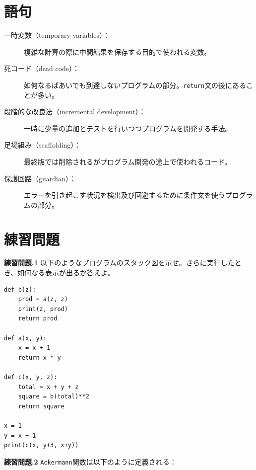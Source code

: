 \documentclass[a4j,12pt,makeidx]{jbook}
\newcommand{\tp}{\thechapter}
\begin{document}
\section{語句}
\begin{description}
\item[一時変数（temporary variables）：]複雑な計算の際に中間結果を保存する目的で使われる変数。

\item[死コード（dead code）：]如何なるばあいでも到達しないプログラムの部分。{\tt return}文の後にあることが多い。  

\item[段階的な改良法（incremental development）：]一時に少量の追加とテストを行いつつプログラムを開発する手法。

\item[足場組み（scaffolding）：]最終版では削除されるがプログラム開発の途上で使われるコード。

\item[保護回路（guardian）：]エラーを引き起こす状況を検出及び回避するために条件文を使うプログラムの部分。
\end{description}
%
\section{練習問題}
\noindent
{\bf 練習問題\tp.1} 以下のようなプログラムのスタック図を示せ。さらに実行したとき、如何なる表示が出るか答えよ。
\begin{verbatim}
def b(z):
    prod = a(z, z)
    print(z, prod)
    return prod

def a(x, y):
    x = x + 1
    return x * y

def c(x, y, z):
    total = x + y + z
    square = b(total)**2
    return square

x = 1
y = x + 1
print(c(x, y+3, x+y))
\end{verbatim}

\noindent
{\bf 練習問題\tp.2} {\tt Ackermann}関数は以下のように定義される：\\
%
\end{document}
